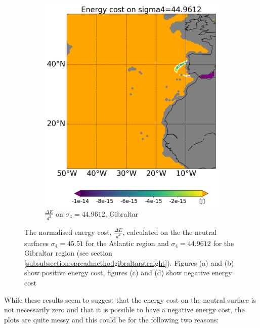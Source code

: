 \begin{figure}[htbp]
\begin{subfigure}[b]{0.4\textwidth}
         \includegraphics[width=\textwidth]{plots/energy/gibraltar_energy/Map2dcyl_neg_energy_on_sigma4_4496e-2_reg310Eto360E05Nto57N_1990to1998av_WOCE.png}
         \caption{$\frac{\Delta E}{d^2}$ on $\sigma_4 = 44.9612$, Gibraltar}
         \label{fig:subplot_gibraltar_neg_energy_sigma_4}
     \end{subfigure}
     
    \caption{The normalised energy cost, $\frac{\Delta E}{d^2}$, calculated on the the neutral surfaces $\sigma_4 = 45.51$ for the Atlantic region and  $\sigma_4 = 44.9612$ for the Gibraltar region (see section \ref{subsubsection:spreadmethodgibraltarstraight}). Figures (a) and (b) show positive energy cost, figures (c) and (d) show negative energy cost}
    \label{fig:energy_sigma_4}
    
\end{figure}

While these results seem to suggest that the energy cost on the neutral surface is not necessarily zero and that it is possible to have a negative energy cost, the plots are quite messy and this could be for the following two reasons:

